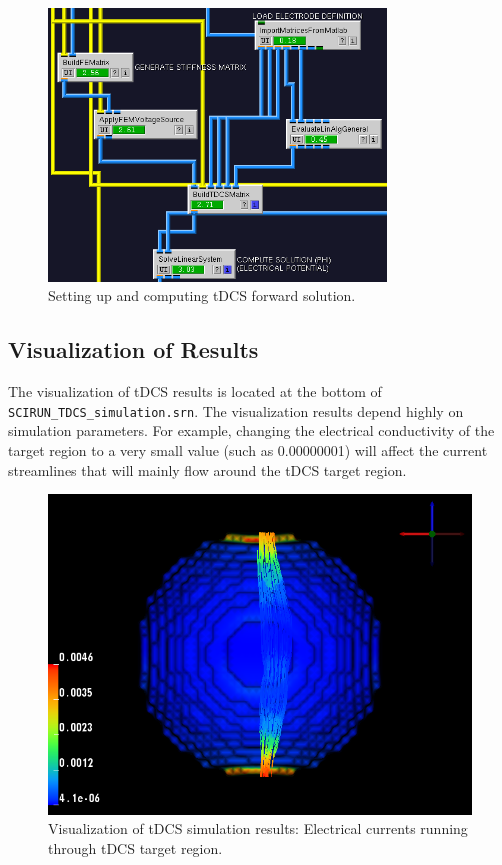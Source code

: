 \documentclass[fleqn,11pt,openany]{book}
\begin{document}
\begin{figure}[!h]
\centering
\includegraphics[width=0.8\textwidth]{ElectricalBrainStimulationTutorial_figures/fem_setup.png}
\caption{Setting up and computing tDCS forward solution.}
\label{fig:sim_femsetting}
\end{figure}

\subsection{Visualization of Results}

The visualization of tDCS results is located at the bottom of \\
\texttt{SCIRUN\_TDCS\_simulation.srn}.
The visualization results depend highly on simulation parameters.
For example, changing the electrical conductivity of the target region to a very small value (such as 0.00000001) will affect the current streamlines that will mainly flow around the tDCS target region.

\begin{figure}[!h]
\centering
\includegraphics[scale=0.6]{ElectricalBrainStimulationTutorial_figures/current.png}
\caption{Visualization of tDCS simulation results: Electrical currents running through tDCS target region.}
\label{fig:sim_vis}
\end{figure}
\end{document}
